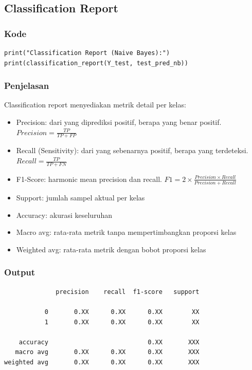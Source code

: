 \documentclass[12pt,a4paper]{article}
\begin{document}
\subsection{Classification Report}

\subsubsection{Kode}
\begin{lstlisting}[style=pythonstyle]
print("Classification Report (Naive Bayes):")
print(classification_report(Y_test, test_pred_nb))
\end{lstlisting}

\subsubsection{Penjelasan}
Classification report menyediakan metrik detail per kelas:
\begin{itemize}
    \item Precision: dari yang diprediksi positif, berapa yang benar positif. $Precision = \frac{TP}{TP + FP}$
    \item Recall (Sensitivity): dari yang sebenarnya positif, berapa yang terdeteksi. $Recall = \frac{TP}{TP + FN}$
    \item F1-Score: harmonic mean precision dan recall. $F1 = 2 \times \frac{Precision \times Recall}{Precision + Recall}$
    \item Support: jumlah sampel aktual per kelas
    \item Accuracy: akurasi keseluruhan
    \item Macro avg: rata-rata metrik tanpa mempertimbangkan proporsi kelas
    \item Weighted avg: rata-rata metrik dengan bobot proporsi kelas
\end{itemize}

\subsubsection{Output}
\begin{verbatim}
              precision    recall  f1-score   support

           0       0.XX      0.XX      0.XX        XX
           1       0.XX      0.XX      0.XX        XX

    accuracy                           0.XX       XXX
   macro avg       0.XX      0.XX      0.XX       XXX
weighted avg       0.XX      0.XX      0.XX       XXX
\end{verbatim}
\end{document}
